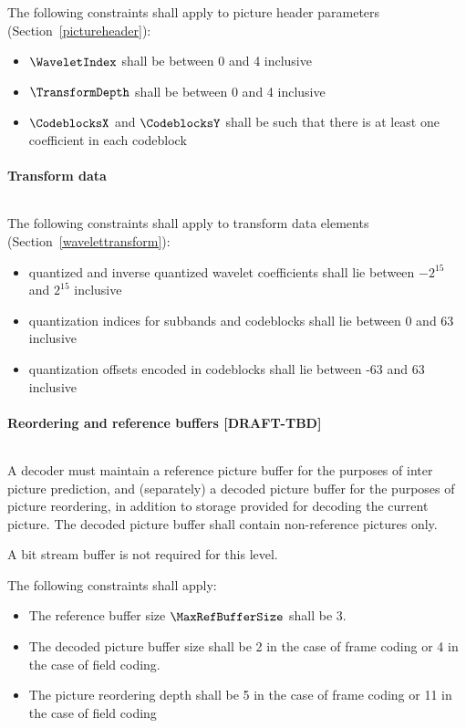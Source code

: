 The following constraints shall apply to picture header parameters
(Section~\ref{pictureheader}):
\begin{itemize}
\item $\WaveletIndex$ shall be between 0 and 4 inclusive
\item $\TransformDepth$ shall be between 0 and 4 inclusive
\item $\CodeblocksX$ and $\CodeblocksY$ shall be such that there is 
    at least one coefficient in each codeblock
\end{itemize}

\paragraph{Transform data}$\ $\newline

The following constraints shall apply to transform data elements 
(Section~\ref{wavelettransform}):
\begin{itemize}
\item quantized and inverse quantized wavelet coefficients shall lie 
between $-2^{15}$ and $2^{15}$ inclusive
\item quantization indices for subbands and codeblocks shall lie between 
    0 and 63 inclusive 
\item quantization offsets encoded in codeblocks shall lie between 
    -63 and 63 inclusive
\end{itemize} 

\paragraph{Reordering and reference buffers [DRAFT-TBD]}$\ $\newline


A decoder must maintain a reference picture buffer for the 
purposes of inter picture prediction, and (separately) a decoded 
picture buffer for the purposes of picture reordering, in addition to 
storage provided for decoding the current picture. The decoded picture
buffer shall contain non-reference pictures only. 

A bit stream buffer is not required for this level.

The following constraints shall apply:
\begin{itemize}
\item The reference buffer size $\MaxRefBufferSize$ shall be 3.
\item The decoded picture buffer size shall be 2 in the case
of frame coding or 4 in the case of field coding.
\item The picture reordering depth shall be 5 in the case of frame coding
or 11 in the case of field coding
\end{itemize}















